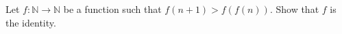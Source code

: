 Let $f : \mathbb{N} \to \mathbb{N}$ be a function such that $f(n+1) > f(f(n))$. Show that $f$ is the identity.
